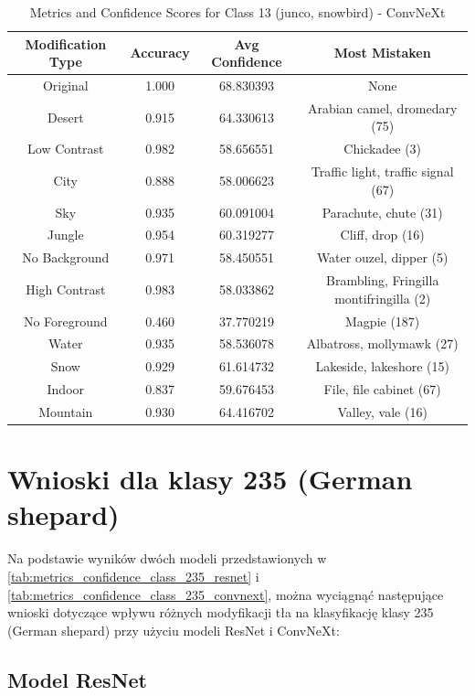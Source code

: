 \begin{table}
	\centering
	\begin{tabular}{|c|c|c|c|}
		\hline
		\textbf{Modification Type} & \textbf{Accuracy} & \textbf{Avg Confidence} & \textbf{Most Mistaken} \\
		\hline
		Original & 1.000 & 68.830393 & None \\
		\hline
		Desert & 0.915 & 64.330613 & Arabian camel, dromedary (75) \\
		\hline
		Low Contrast & 0.982 & 58.656551 & Chickadee (3) \\
		\hline
		City & 0.888 & 58.006623 & Traffic light, traffic signal (67) \\
		\hline
		Sky & 0.935 & 60.091004 & Parachute, chute (31) \\
		\hline
		Jungle & 0.954 & 60.319277 & Cliff, drop (16) \\
		\hline
		No Background & 0.971 & 58.450551 & Water ouzel, dipper (5) \\
		\hline
		High Contrast & 0.983 & 58.033862 & Brambling, Fringilla montifringilla (2) \\
		\hline
		No Foreground & 0.460 & 37.770219 & Magpie (187) \\
		\hline
		Water & 0.935 & 58.536078 & Albatross, mollymawk (27) \\
		\hline
		Snow & 0.929 & 61.614732 & Lakeside, lakeshore (15) \\
		\hline
		Indoor & 0.837 & 59.676453 & File, file cabinet (67) \\
		\hline
		Mountain & 0.930 & 64.416702 & Valley, vale (16) \\
		\hline
	\end{tabular}
	\caption{Metrics and Confidence Scores for Class 13 (junco, snowbird) - ConvNeXt}
	\label{tab:metrics_confidence_class_13_convnext}
\end{table}

\section*{Wnioski dla klasy 235 (German shepard)}

Na podstawie wyników dwóch modeli przedstawionych w \ref*{tab:metrics_confidence_class_235_resnet} i \ref*{tab:metrics_confidence_class_235_convnext}, można wyciągnąć następujące wnioski dotyczące wpływu różnych 
modyfikacji tła na klasyfikację klasy 235 (German shepard) przy użyciu modeli ResNet i ConvNeXt:

\subsection*{Model ResNet}

